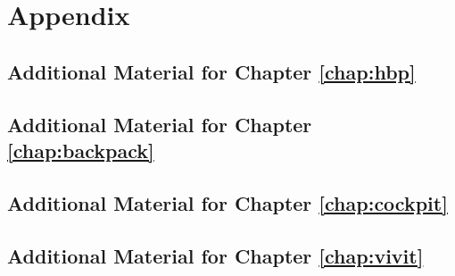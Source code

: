 
\appendix %

\part{Appendix}\label{part:appendix}

\setchapterpreamble[u]{\margintoc}
\chapter{Additional Material for Chapter \ref{chap:hbp}}


\setchapterpreamble[u]{\margintoc}
\chapter{Additional Material for Chapter \ref{chap:backpack}}


\setchapterpreamble[u]{\margintoc}
\chapter{Additional Material for Chapter \ref{chap:cockpit}}


\setchapterpreamble[u]{\margintoc}
\chapter{Additional Material for Chapter \ref{chap:vivit}}



\backmatter%





